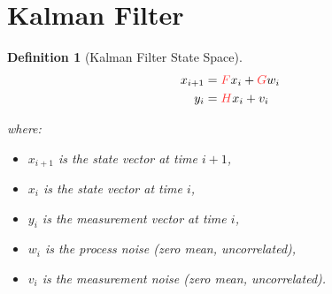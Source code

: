\documentclass[a4 paper]{article}
\numberwithin{equation}{section}
\theoremstyle{boldStyle}
\theoremstyle{boldBlueStyle}
\theoremstyle{boldPurpleStyle}
\theoremstyle{boldRedStyle}
\newtheorem{definition}{Definition}[section]
\theoremstyle{boldGreenStyle}
\begin{document}
\newpage
\section{Kalman Filter}


\begin{definition}[Kalman Filter State Space] 
  \begin{equation}
    \begin{aligned}
      x_{i+1} &= \tred{F} x_i + \tred{G} w_i \\
      y_i &= \tred{H} x_i + v_i
    \end{aligned}
  \end{equation}

  where:
\begin{itemize}
    \item \( x_{i+1} \) is the state vector at time \( i+1 \),
    \item \( x_i \) is the state vector at time \( i \),
    \item \( y_i \) is the measurement vector at time \( i \),
    \item \( w_i \) is the process noise (zero mean, uncorrelated),
    \item \( v_i \) is the measurement noise (zero mean, uncorrelated).
\end{itemize}
\end{definition}
\end{document}

